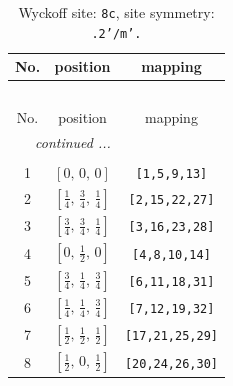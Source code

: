 \documentclass[fleqn,8pt]{jsarticle}
\begin{document}
\renewcommand{\arraystretch}{1.2}
\begin{longtable}{ccc}
\caption{Wyckoff site: {\tt 8c}, site symmetry: {\tt .2'/m'.}}
 \\
 \hline \hline
No. & position & mapping \\ \hline \endfirsthead

\multicolumn{2}{l}{\tablename\ \thetable{}} \\
 \hline \hline
No. & position & mapping \\ \hline \endhead

 \hline \hline
\multicolumn{2}{r}{\footnotesize\it continued ...} \\ \endfoot

 \hline \hline
\multicolumn{2}{r}{} \\ \endlastfoot

1 & $\left[ 0,\, 0,\, 0 \right]$ & {\tt [1,5,9,13]} \\ \hline
2 & $\left[ \frac{1}{4},\, \frac{3}{4},\, \frac{1}{4} \right]$ & {\tt [2,15,22,27]} \\ \hline
3 & $\left[ \frac{3}{4},\, \frac{3}{4},\, \frac{1}{4} \right]$ & {\tt [3,16,23,28]} \\ \hline
4 & $\left[ 0,\, \frac{1}{2},\, 0 \right]$ & {\tt [4,8,10,14]} \\ \hline
5 & $\left[ \frac{3}{4},\, \frac{1}{4},\, \frac{3}{4} \right]$ & {\tt [6,11,18,31]} \\ \hline
6 & $\left[ \frac{1}{4},\, \frac{1}{4},\, \frac{3}{4} \right]$ & {\tt [7,12,19,32]} \\ \hline
7 & $\left[ \frac{1}{2},\, \frac{1}{2},\, \frac{1}{2} \right]$ & {\tt [17,21,25,29]} \\ \hline
8 & $\left[ \frac{1}{2},\, 0,\, \frac{1}{2} \right]$ & {\tt [20,24,26,30]} \\
\end{longtable}
\renewcommand{\arraystretch}{1.2}
\end{document}
